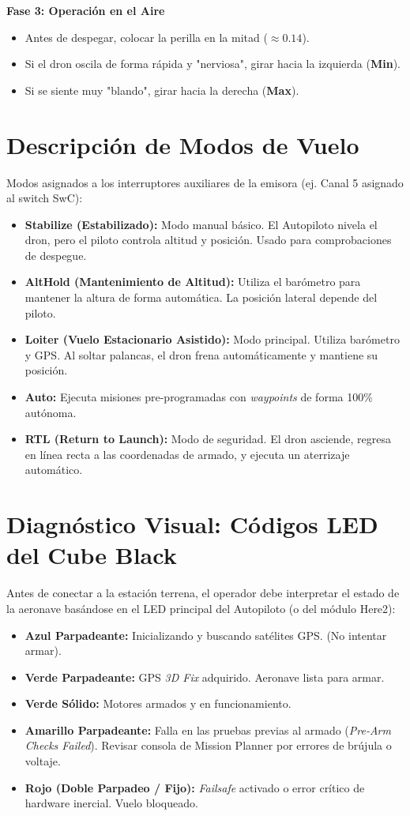 \documentclass[12pt,a4paper]{article}
\begin{document}
\textbf{Fase 3: Operación en el Aire}
\begin{itemize}[leftmargin=*]
    \item Antes de despegar, colocar la perilla en la mitad ($\approx 0.14$).
    \item Si el dron oscila de forma rápida y "nerviosa", girar hacia la izquierda (\textbf{Min}).
    \item Si se siente muy "blando", girar hacia la derecha (\textbf{Max}).
\end{itemize}

\section{Descripción de Modos de Vuelo}
Modos asignados a los interruptores auxiliares de la emisora (ej. Canal 5 asignado al switch SwC):
\begin{itemize}[leftmargin=*]
    \item \textbf{Stabilize (Estabilizado):} Modo manual básico. El Autopiloto nivela el dron, pero el piloto controla altitud y posición. Usado para comprobaciones de despegue.
    \item \textbf{AltHold (Mantenimiento de Altitud):} Utiliza el barómetro para mantener la altura de forma automática. La posición lateral depende del piloto.
    \item \textbf{Loiter (Vuelo Estacionario Asistido):} Modo principal. Utiliza barómetro y GPS. Al soltar palancas, el dron frena automáticamente y mantiene su posición.
    \item \textbf{Auto:} Ejecuta misiones pre-programadas con \textit{waypoints} de forma 100\% autónoma.
    \item \textbf{RTL (Return to Launch):} Modo de seguridad. El dron asciende, regresa en línea recta a las coordenadas de armado, y ejecuta un aterrizaje automático.
\end{itemize}

\section{Diagnóstico Visual: Códigos LED del Cube Black}
Antes de conectar a la estación terrena, el operador debe interpretar el estado de la aeronave basándose en el LED principal del Autopiloto (o del módulo Here2):
\begin{itemize}[leftmargin=*]
    \item \textbf{Azul Parpadeante:} Inicializando y buscando satélites GPS. (No intentar armar).
    \item \textbf{Verde Parpadeante:} GPS \textit{3D Fix} adquirido. Aeronave lista para armar.
    \item \textbf{Verde Sólido:} Motores armados y en funcionamiento.
    \item \textbf{Amarillo Parpadeante:} Falla en las pruebas previas al armado (\textit{Pre-Arm Checks Failed}). Revisar consola de Mission Planner por errores de brújula o voltaje.
    \item \textbf{Rojo (Doble Parpadeo / Fijo):} \textit{Failsafe} activado o error crítico de hardware inercial. Vuelo bloqueado.
\end{itemize}
\end{document}
